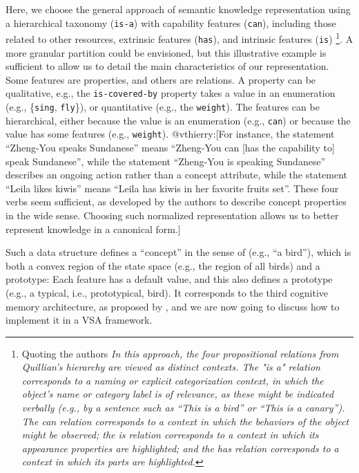 \documentclass[sn-mathphys]{sn-jnl}
\makeatletter
\newcommand{\vthierry}[1]{{\color{magenta} @vthierry:[#1]}}
\makeatother
\begin{document}
Here, we choose the general approach of semantic knowledge representation using a hierarchical taxonomy ({\tt is-a}) with capability features ({\tt can}), including those related to other resources, extrinsic features ({\tt has}), and intrinsic features ({\tt is}) \cite{mcclelland_parallel_2003}\footnote{Quoting the authors {\em In this approach, the four propositional relations from Quillian’s hierarchy are viewed as distinct contexts. The "is a" relation corresponds to a naming or explicit categorization context, in which the object’s name or category label is of relevance, as these might be indicated verbally (e.g., by a sentence such as “This is a bird” or “This is a canary”). The can relation corresponds to a context in which the behaviors of the object might be observed; the is relation corresponds to a context in which its appearance properties are highlighted; and the has relation corresponds to a context in which its parts are highlighted.}}.
A more granular partition could be envisioned, but this illustrative example is sufficient to allow us to detail the main characteristics of our representation.
Some features are properties, and others are relations. A property can be qualitative, e.g., the {\tt is-covered-by} property takes a value in an enumeration (e.g., \{{\tt sing}, {\tt fly}\}), or quantitative (e.g., the {\tt weight}). The features can be hierarchical, either because the value is an enumeration (e.g., {\tt can}) or because the value has some features (e.g., {\tt weight}). \vthierry{For instance, the statement ``Zheng-You speaks Sundanese'' means ``Zheng-You can [has the capability to] speak Sundanese'', while the statement ``Zheng-You is speaking Sundanese'' describes an ongoing action rather than a concept attribute, while the statement ``Leila likes kiwis'' means ``Leila has kiwis in her favorite fruits set''. These four verbs seem sufficient, as developed by the authors to describe concept properties in the wide sense. Choosing such normalized representation allows us to better represent knowledge in a canonical form.}

Such a data structure defines a ``concept'' in the sense of \cite{gardenfors_conceptual_2004} (e.g., ``a bird''), which is both a convex region of the state space (e.g., the region of all birds) and a prototype: Each feature has a default value, and this also defines a prototype (e.g., a typical, i.e., prototypical, bird). It corresponds to the third cognitive memory architecture, as proposed by \cite{eichenbaum_memory_2017}, and we are now going to discuss how to implement it in a VSA framework.
\end{document}
